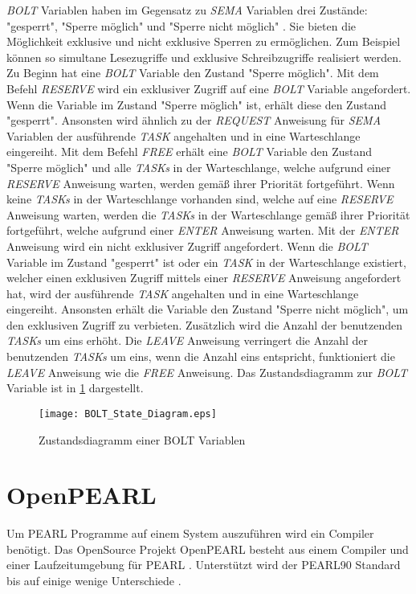 \emph{BOLT} Variablen haben im Gegensatz zu \emph{SEMA} Variablen drei Zustände:
"gesperrt", "Sperre möglich" und "Sperre nicht möglich" \autocite[9--17]{PEARL}.
Sie bieten die Möglichkeit exklusive und nicht exklusive Sperren zu ermöglichen.
Zum Beispiel können so simultane Lesezugriffe und exklusive Schreibzugriffe
realisiert werden. Zu Beginn hat eine \emph{BOLT} Variable den Zustand "Sperre
möglich". Mit dem Befehl \emph{RESERVE} wird ein exklusiver Zugriff auf eine
\emph{BOLT} Variable angefordert. Wenn die Variable im Zustand "Sperre möglich"
ist, erhält diese den Zustand "gesperrt". Ansonsten wird ähnlich zu der
\emph{REQUEST} Anweisung für \emph{SEMA} Variablen der ausführende \emph{TASK}
angehalten und in eine Warteschlange eingereiht. Mit dem Befehl \emph{FREE}
erhält eine \emph{BOLT} Variable den Zustand "Sperre möglich" und alle
\emph{TASKs} in der Warteschlange, welche aufgrund einer \emph{RESERVE}
Anweisung warten, werden gemäß ihrer Priorität fortgeführt. Wenn keine
\emph{TASKs} in der Warteschlange vorhanden sind, welche auf eine \emph{RESERVE}
Anweisung warten, werden die \emph{TASKs} in der Warteschlange gemäß ihrer
Priorität fortgeführt, welche aufgrund einer \emph{ENTER} Anweisung warten. Mit
der \emph{ENTER} Anweisung wird ein nicht exklusiver Zugriff angefordert. Wenn
die \emph{BOLT} Variable im Zustand "gesperrt" ist oder ein \emph{TASK} in der
Warteschlange existiert, welcher einen exklusiven Zugriff mittels einer
\emph{RESERVE} Anweisung angefordert hat, wird der ausführende \emph{TASK}
angehalten und in eine Warteschlange eingereiht. Ansonsten erhält die Variable
den Zustand "Sperre nicht möglich", um den exklusiven Zugriff zu verbieten.
Zusätzlich wird die Anzahl der benutzenden \emph{TASKs} um eins erhöht. Die
\emph{LEAVE} Anweisung verringert die Anzahl der benutzenden \emph{TASKs} um
eins, wenn die Anzahl eins entspricht, funktioniert die \emph{LEAVE} Anweisung
wie die \emph{FREE} Anweisung. Das Zustandsdiagramm zur \emph{BOLT} Variable ist
in \cref{fig:BOLT_StateDiagram} dargestellt.
\begin{figure}[ht]
  \texttt{[image: BOLT\_State\_Diagram.eps]}
  \caption{Zustandsdiagramm einer BOLT Variablen}
  \label{fig:BOLT_StateDiagram}
\end{figure}

\section{OpenPEARL}
\label{section:OpenPEARL}
Um PEARL Programme auf einem System auszuführen wird ein Compiler benötigt. Das
OpenSource Projekt OpenPEARL besteht aus einem Compiler und einer
Laufzeitumgebung für PEARL \autocite{OpenPEARL}. Unterstützt wird der PEARL90
Standard bis auf einige wenige Unterschiede
\autocite{OpenPEARL_Differences_To_PEARL90}.

